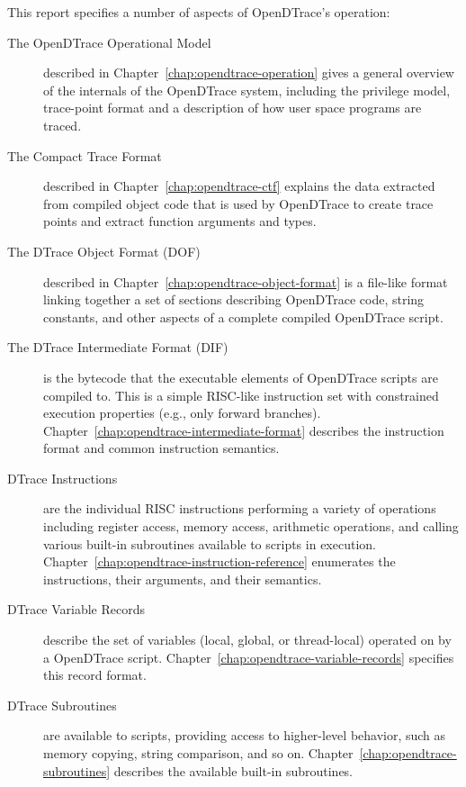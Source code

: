This report specifies a number of aspects of OpenDTrace's operation:

\begin{description}

\item[The OpenDTrace Operational Model] described in
  Chapter~\ref{chap:opendtrace-operation} gives a general overview of
  the internals of the OpenDTrace system, including the privilege
  model, trace-point format and a description of how user space
  programs are traced.

\item[The Compact Trace Format] described in
  Chapter~\ref{chap:opendtrace-ctf} explains the data extracted from
  compiled object code that is used by OpenDTrace to create trace
  points and extract function arguments and types.

\item[The DTrace Object Format (DOF)] described in
  Chapter~\ref{chap:opendtrace-object-format} is a file-like format linking
  together a set of sections describing OpenDTrace code, string constants, and
  other aspects of a complete compiled OpenDTrace script.

\item[The DTrace Intermediate Format (DIF)] is the bytecode that the
  executable elements of OpenDTrace scripts are compiled to.
  This is a simple RISC-like instruction set with constrained execution
  properties (e.g., only forward branches).
  Chapter~\ref{chap:opendtrace-intermediate-format} describes the instruction
  format and common instruction semantics.

\item[DTrace Instructions] are the individual RISC instructions performing
  a variety of operations including register access, memory access, arithmetic
  operations, and calling various built-in subroutines available to scripts in
  execution.
  Chapter~\ref{chap:opendtrace-instruction-reference} enumerates the instructions,
  their arguments, and their semantics.

\item[DTrace Variable Records] describe the set of variables (local, global,
  or thread-local) operated on by a OpenDTrace script.
  Chapter~\ref{chap:opendtrace-variable-records} specifies this record format.

\item[DTrace Subroutines] are available to scripts, providing access to
  higher-level behavior, such as memory copying, string comparison, and so on.
  Chapter~\ref{chap:opendtrace-subroutines} describes the available built-in
  subroutines.

\end{description}
